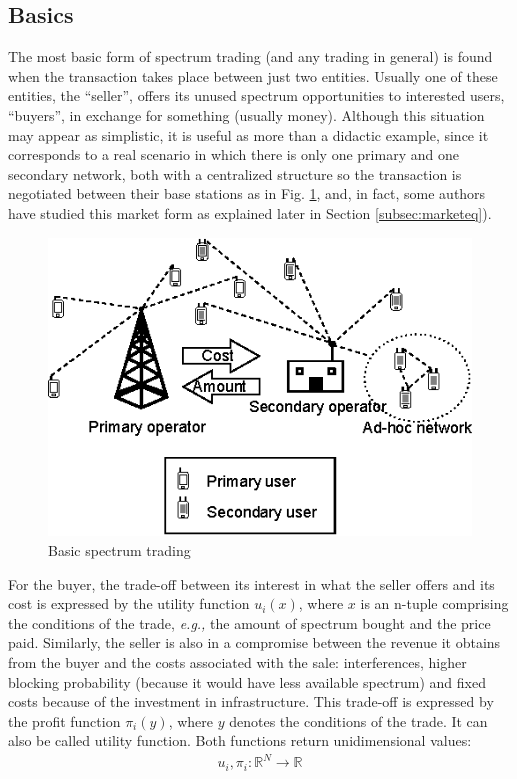 \subsection{Basics} 
\label{subsec:When}
The most basic form of spectrum trading (and any trading in general) is found when the transaction takes place between just two entities. Usually one of these entities, the ``seller'', offers its unused spectrum opportunities to interested users, ``buyers'', in exchange for something (usually money). Although this situation may appear as simplistic, it is useful as more than a didactic example, since it corresponds to a real scenario in which there is only one primary and one secondary network, both with a centralized structure so the transaction is negotiated between their base stations as in Fig. \ref{fig:BasicMarket}, and, in fact, some authors have studied this market form as explained later in Section \ref{subsec:marketeq}). 

\begin{figure}[!ht]
  \begin{center}
  \includegraphics[scale=1]{Fig1.eps}
  \end{center}
  \caption{Basic spectrum trading}
   \label{fig:BasicMarket}
\end{figure}

For the buyer, the trade-off between its interest in what the seller offers and its cost is expressed by the utility function $u_i(x)$, where $x$ is an n-tuple comprising the conditions of the trade, \textit{e.g.,} the amount of spectrum bought and the price paid. Similarly, the seller is also in a compromise between the revenue it obtains from the buyer and the costs associated with the sale: interferences, higher blocking probability (because it would have less available spectrum) and fixed costs because of the investment in infrastructure. This trade-off is expressed by the profit function $\pi_i(y)$, where $y$ denotes the conditions of the trade. It can also be called utility function. Both functions return unidimensional values:
\begin{equation}
\begin {array} {lcl}
u_i, \pi_i :  \mathbb{R}^N \rightarrow \mathbb{R}
\end{array}
\end{equation}

